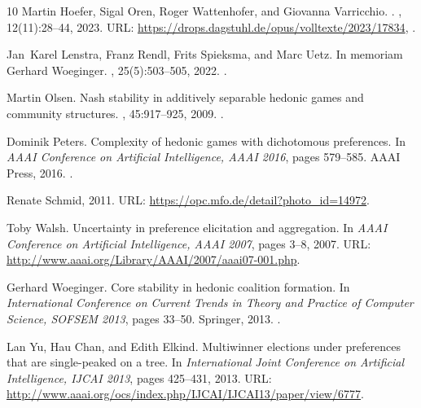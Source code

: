 \documentclass[a4paper]{article}
\begin{document}
\begin{thebibliography}{10}
Martin Hoefer, Sigal Oren, Roger Wattenhofer, and Giovanna Varricchio.
.
, 12(11):28--44, 2023.
\newblock URL: \url{https://drops.dagstuhl.de/opus/volltexte/2023/17834}, \href {https://doi.org/10.4230/DagRep.12.11.28} {}.

Jan~Karel Lenstra, Franz Rendl, Frits Spieksma, and Marc Uetz.
\newblock In memoriam {G}erhard {W}oeginger.
, 25(5):503--505, 2022.
\newblock \href {https://doi.org/10.1007/s10951-022-00748-4} {}.

Martin Olsen.
\newblock Nash stability in additively separable hedonic games and community structures.
, 45:917--925, 2009.
\newblock \href {https://doi.org/10.1007/s00224-009-9176-8} {}.

Dominik Peters.
\newblock Complexity of hedonic games with dichotomous preferences.
\newblock In {\em {AAAI} Conference on Artificial Intelligence, {AAAI 2016}}, pages 579--585. {AAAI} Press, 2016.
\newblock \href {https://doi.org/10.1609/AAAI.V30I1.10047} {}.

Renate Schmid, 2011.
\newblock URL: \url{https://opc.mfo.de/detail?photo_id=14972}.

Toby Walsh.
\newblock Uncertainty in preference elicitation and aggregation.
\newblock In {\em {AAAI} Conference on Artificial Intelligence, {AAAI 2007}}, pages 3--8, 2007.
\newblock URL: \url{http://www.aaai.org/Library/AAAI/2007/aaai07-001.php}.

Gerhard Woeginger.
\newblock Core stability in hedonic coalition formation.
\newblock In {\em International Conference on Current Trends in Theory and Practice of Computer Science, {SOFSEM 2013}}, pages 33--50. Springer, 2013.
\newblock \href {https://doi.org/10.1007/978-3-642-35843-2_4} {}.

Lan Yu, Hau Chan, and Edith Elkind.
\newblock Multiwinner elections under preferences that are single-peaked on a tree.
\newblock In {\em International Joint Conference on Artificial Intelligence, {IJCAI 2013}}, pages 425--431, 2013.
\newblock URL: \url{http://www.aaai.org/ocs/index.php/IJCAI/IJCAI13/paper/view/6777}.

\end{thebibliography}
\end{document}
